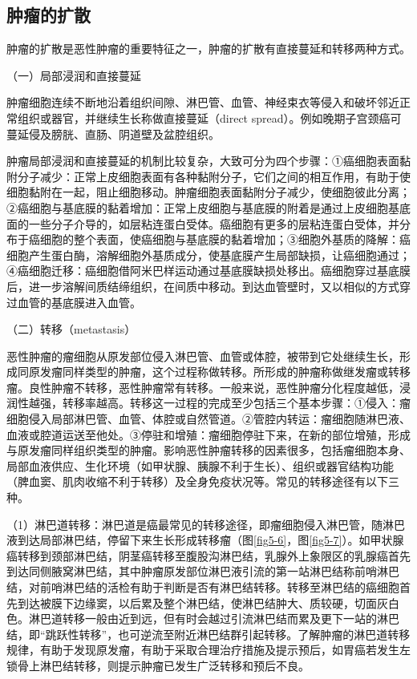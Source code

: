 \subsection{肿瘤的扩散}

肿瘤的扩散是恶性肿瘤的重要特征之一，肿瘤的扩散有直接蔓延和转移两种方式。

{（一）局部浸润和直接蔓延}

肿瘤细胞连续不断地沿着组织间隙、淋巴管、血管、神经束衣等侵入和破坏邻近正常组织或器官，并继续生长称做直接蔓延（direct
spread）。例如晚期子宫颈癌可蔓延侵及膀胱、直肠、阴道壁及盆腔组织。

肿瘤局部浸润和直接蔓延的机制比较复杂，大致可分为四个步骤：①癌细胞表面黏附分子减少：正常上皮细胞表面有各种黏附分子，它们之间的相互作用，有助于使细胞黏附在一起，阻止细胞移动。肿瘤细胞表面黏附分子减少，使细胞彼此分离；②癌细胞与基底膜的黏着增加：正常上皮细胞与基底膜的附着是通过上皮细胞基底面的一些分子介导的，如层粘连蛋白受体。癌细胞有更多的层粘连蛋白受体，并分布于癌细胞的整个表面，使癌细胞与基底膜的黏着增加；③细胞外基质的降解：癌细胞产生蛋白酶，溶解细胞外基质成分，使基底膜产生局部缺损，让癌细胞通过；④癌细胞迁移：癌细胞借阿米巴样运动通过基底膜缺损处移出。癌细胞穿过基底膜后，进一步溶解间质结缔组织，在间质中移动。到达血管壁时，又以相似的方式穿过血管的基底膜进入血管。

{（二）转移（metastasis）}

恶性肿瘤的瘤细胞从原发部位侵入淋巴管、血管或体腔，被带到它处继续生长，形成同原发瘤同样类型的肿瘤，这个过程称做转移。所形成的肿瘤称做继发瘤或转移瘤。良性肿瘤不转移，恶性肿瘤常有转移。一般来说，恶性肿瘤分化程度越低，浸润性越强，转移率越高。转移这一过程的完成至少包括三个基本步骤：①侵入：瘤细胞侵入局部淋巴管、血管、体腔或自然管道。②管腔内转运：瘤细胞随淋巴液、血液或腔道运送至他处。③停驻和增殖：瘤细胞停驻下来，在新的部位增殖，形成与原发瘤同样组织类型的肿瘤。影响恶性肿瘤转移的因素很多，包括瘤细胞本身、局部血液供应、生化环境（如甲状腺、胰腺不利于生长）、组织或器官结构功能（脾血窦、肌肉收缩不利于转移）及全身免疫状况等。常见的转移途径有以下三种。

（1）淋巴道转移：淋巴道是癌最常见的转移途径，即瘤细胞侵入淋巴管，随淋巴液到达局部淋巴结，停留下来生长形成转移瘤（图\ref{fig5-6}，图\ref{fig5-7}）。如甲状腺癌转移到颈部淋巴结，阴茎癌转移至腹股沟淋巴结，乳腺外上象限区的乳腺癌首先到达同侧腋窝淋巴结，其中肿瘤原发部位淋巴液引流的第一站淋巴结称前哨淋巴结，对前哨淋巴结的活检有助于判断是否有淋巴结转移。转移至淋巴结的癌细胞首先到达被膜下边缘窦，以后累及整个淋巴结，使淋巴结肿大、质较硬，切面灰白色。淋巴道转移一般由近到远，但有时会越过引流淋巴结而累及更下一站的淋巴结，即“跳跃性转移”，也可逆流至附近淋巴结群引起转移。了解肿瘤的淋巴道转移规律，有助于发现原发瘤，有助于采取合理治疗措施及提示预后，如胃癌若发生左锁骨上淋巴结转移，则提示肿瘤已发生广泛转移和预后不良。

